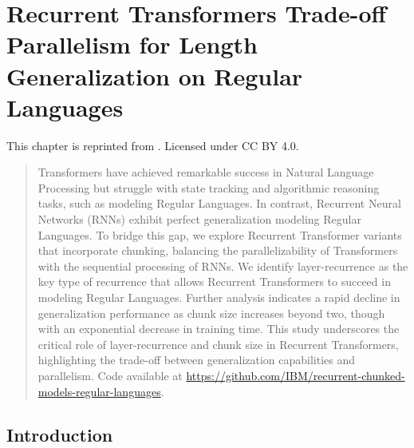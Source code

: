 
\chapter{Recurrent Transformers Trade-off Parallelism for Length Generalization on Regular Languages} \label{chap:chap-4}


\begin{singlespace}         %
    This chapter is reprinted from . Licensed under CC BY 4.0.
\end{singlespace} 

\begin{abstract}
    Transformers have achieved remarkable success in Natural Language Processing but struggle with state tracking and algorithmic reasoning tasks, such as modeling Regular Languages. In contrast, Recurrent Neural Networks (RNNs) exhibit perfect generalization modeling Regular Languages. To bridge this gap, we explore Recurrent Transformer variants that incorporate chunking, balancing the parallelizability of Transformers with the sequential processing of RNNs. We identify layer-recurrence as the key type of recurrence that allows Recurrent Transformers to succeed in modeling Regular Languages. Further analysis indicates a rapid decline in generalization performance as chunk size increases beyond two, though with an exponential decrease in training time. This study underscores the critical role of layer-recurrence and chunk size in Recurrent Transformers, highlighting the trade-off between generalization capabilities and parallelism. Code available at \url{https://github.com/IBM/recurrent-chunked-models-regular-languages}.%
    \end{abstract}
    
    \section{Introduction}
    
